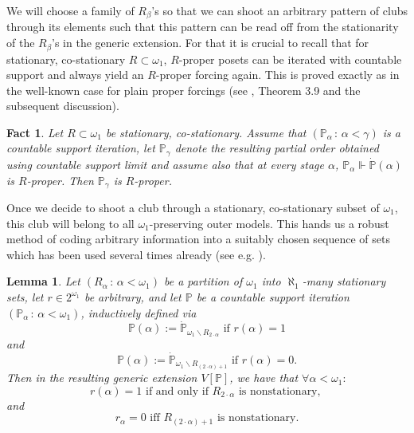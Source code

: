 \documentclass[a4paper,11pt]{article}
\newtheorem{lemma}[theorem]{Lemma}
\newtheorem{fact}[theorem]{Fact}
\newcommand{\forceP}{\mathbb{P}}
\begin{document}
We will choose a family of $R_{\beta}$'s so that we can shoot an arbitrary pattern of clubs through its elements such that this pattern can be read off
from the stationarity of the $R_{\beta}$'s in the generic extension.
For that it is crucial to recall that for stationary, co-stationary  $R \subset \omega_1$, $R$-proper posets can be iterated with countable support and always yield an $R$-proper forcing again. This is proved exactly as in the well-known case for plain proper forcings (see \cite{Goldstern}, Theorem 3.9 and the subsequent discussion).
\begin{fact}
Let $R \subset \omega_1$ be stationary, co-stationary. Assume that $(\forceP_{\alpha} \, : \, \alpha< \gamma)$ is a countable support iteration, let $\forceP_{\gamma}$ denote the resulting partial order obtained using countable support limit and assume also that at every stage $\alpha$, $\forceP_{\alpha} \Vdash  \dot{\forceP}({\alpha})$ is $R$-proper. Then $\forceP_{\gamma}$ is $R$-proper.
\end{fact}


Once we decide to shoot a club through a stationary, co-stationary subset of $\omega_1$, this club will belong to all $\omega_1$-preserving outer models. This hands us a robust method of coding arbitrary information into a suitably chosen sequence of sets
which has been used several times already (see e.g. \cite{SyVera}).
\begin{lemma}\label{coding with stationary sets}
 Let $(R_{ \alpha} \, : \, \alpha < \omega_1)$ be a partition of $\omega_1$ into $\aleph_1$-many stationary sets, let  $r \in 2^{\omega_1}$ be arbitrary, and let $\forceP$ be a countable support iteration $(\forceP_{\alpha} \, : \, \alpha < \omega_1)$, inductively defined via \[\forceP(\alpha) := \dot{\forceP}_{\omega_1 \backslash R_{2 \cdot \alpha}} \text{ if } r(\alpha)=1 \] and
 \[\forceP({\alpha}) := \dot{\forceP}_{\omega_1 \backslash R_{(2 \cdot\alpha) +1}} \text{ if } r(\alpha)=0.\]
 Then in the resulting generic extension $V[\forceP]$, we have that $\forall \alpha < \omega_1:$ \[ r(\alpha)=1 \text{ if and only if }
 R_{2 \cdot \alpha} \text{  is nonstationary, }\]  and \[ r_{\alpha}=0 \text{ iff } R_{(2 \cdot \alpha)+1} \text{ is nonstationary.} \]
\end{lemma}
\end{document}
